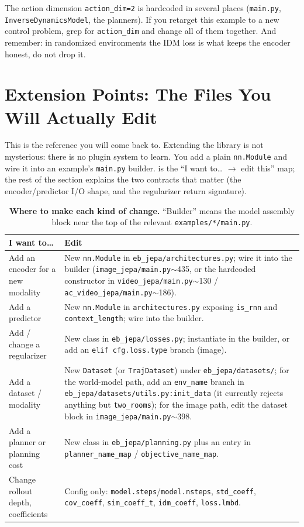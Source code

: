 \documentclass{article}
\newcommand{\code}[1]{\texttt{\small #1}}
\newcommand{\file}[1]{\texttt{\small #1}}
\begin{document}
\begin{gotchabox}
The action dimension \code{action\_dim=2} is hardcoded in several places
(\file{main.py}, \code{InverseDynamicsModel}, the planners). If you retarget this
example to a new control problem, grep for \code{action\_dim} and change all of
them together. And remember: in randomized environments the IDM loss is what keeps
the encoder honest, do not drop it.
\end{gotchabox}
\section{Extension Points: The Files You Will Actually Edit}
\label{sec:extension}

This is the reference you will come back to. Extending the library is not
mysterious: there is no plugin system to learn. You add a plain \code{nn.Module}
and wire it into an example's \file{main.py} builder.  is the
``I want to\ldots{} $\to$ edit this'' map; the rest of the section explains the
two contracts that matter (the encoder/predictor I/O shape, and the regularizer
return signature).

\begin{table}[h]
\centering
\caption{\textbf{Where to make each kind of change.} ``Builder'' means the model
assembly block near the top of the relevant \file{examples/*/main.py}.}
\label{tab:extension}
\small
\begin{tabular}{p{4.6cm}p{9.2cm}}
\toprule
I want to\ldots & Edit \\
\midrule
Add an encoder for a new modality & New \code{nn.Module} in \file{eb\_jepa/architectures.py}; wire it into the builder (\file{image\_jepa/main.py}$\sim$435, or the hardcoded constructor in \file{video\_jepa/main.py}$\sim$130 / \file{ac\_video\_jepa/main.py}$\sim$186). \\
Add a predictor & New \code{nn.Module} in \file{architectures.py} exposing \code{is\_rnn} and \code{context\_length}; wire into the builder. \\
Add / change a regularizer & New class in \file{eb\_jepa/losses.py}; instantiate in the builder, or add an \code{elif cfg.loss.type} branch (image). \\
Add a dataset / modality & New \code{Dataset} (or \code{TrajDataset}) under \file{eb\_jepa/datasets/}; for the world-model path, add an \code{env\_name} branch in \file{eb\_jepa/datasets/utils.py:init\_data} (it currently rejects anything but \code{two\_rooms}); for the image path, edit the dataset block in \file{image\_jepa/main.py}$\sim$398. \\
Add a planner or planning cost & New class in \file{eb\_jepa/planning.py} plus an entry in \code{planner\_name\_map} / \code{objective\_name\_map}. \\
Change rollout depth, coefficients & Config only: \code{model.steps}/\code{model.nsteps}, \code{std\_coeff}, \code{cov\_coeff}, \code{sim\_coeff\_t}, \code{idm\_coeff}, \code{loss.lmbd}. \\
\bottomrule
\end{tabular}
\end{table}
\end{document}
